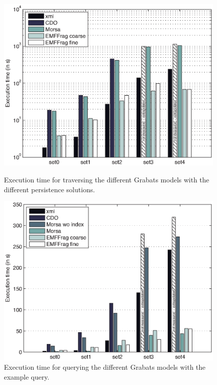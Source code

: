 \begin{figure}[ht]
\begin{minipage}[b]{0.48\linewidth}
\centering
\includegraphics[width=\linewidth]{figures/grabatsTraverseTimeExtra}
\caption{Execution time for traversing the different Grabats models with the different persistence solutions.}
\label{fig:grabatsTraverseTime}
\end{minipage}
\hspace{0.02\linewidth}
\begin{minipage}[b]{0.48\linewidth}
\centering
\includegraphics[width=\linewidth]{figures/grabatsQueryTimeExtra}
\caption{Execution time for querying the different Grabats models with the example query.}

\end{minipage}
\end{figure}
